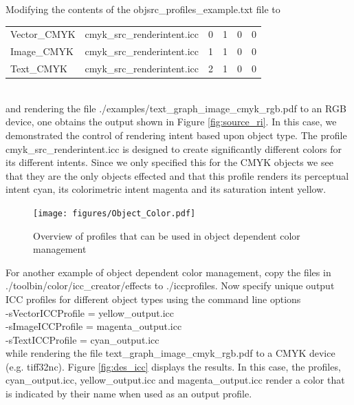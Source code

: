 \documentclass[12pt,notitlepage]{article}
\begin{document}
Modifying the contents of the objsrc\_profiles\_example.txt file to\\

\begin{tabular}{llllll}
Vector\_CMYK & cmyk\_src\_renderintent.icc	& 0 & 1 & 0 & 0\\
Image\_CMYK	& cmyk\_src\_renderintent.icc	& 1 & 1 & 0 & 0 \\
Text\_CMYK	& cmyk\_src\_renderintent.icc	& 2 & 1 & 0 & 0 \\
\end{tabular}\\

\noindent and rendering the file ./examples/text\_graph\_image\_cmyk\_rgb.pdf to an RGB device, one obtains the output shown in Figure \ref{fig:source_ri}.  In this case, we demonstrated the control of rendering intent based upon object type.  The profile cmyk\_src\_renderintent.icc is designed to create significantly different colors for its different intents. Since we only specified this for the CMYK objects we see that they are the only objects effected and that this profile renders its perceptual intent cyan, its colorimetric intent magenta and its saturation intent yellow.

\begin{figure}
    \begin{center}
\texttt{[image: figures/Object\_Color.pdf]}
    \end{center}
   \caption{Overview of profiles that can be used in object dependent color
            management}
\label{fig:object_dep_color}
\end{figure}

For another example of object dependent color management, copy the files in\\
./toolbin/color/icc\_creator/effects to ./iccprofiles.  Now specify unique output ICC profiles for different object types using the command line options\\

\noindent -sVectorICCProfile = yellow\_output.icc\\
-sImageICCProfile = magenta\_output.icc\\
-sTextICCProfile = cyan\_output.icc\\

\noindent while rendering the file text\_graph\_image\_cmyk\_rgb.pdf to a CMYK device (e.g. tiff32nc).  Figure \ref{fig:des_icc} displays the results.  In this case, the profiles,
cyan\_output.icc, yellow\_output.icc and magenta\_output.icc render a color that is indicated by their name when used as an output profile.
\end{document}
